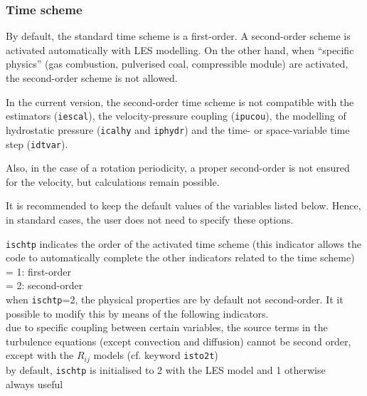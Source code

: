 \subsubsection{Time scheme}

By default, the standard time scheme is a first-order.
A second-order scheme is activated automatically with LES modelling.
On the other hand, when ``specific physics'' (gas combustion, pulverised coal,
compressible module) are activated, the second-order scheme is not allowed.

In the current version, the second-order time scheme is not compatible
with the estimators ({\tt iescal}), the velocity-pressure coupling
({\tt ipucou}), the modelling of hydrostatic pressure ({\tt icalhy} and
{\tt iphydr}) and the time- or space-variable time step ({\tt idtvar}).

Also, in the case of a rotation periodicity, a proper second-order is not
ensured for the velocity, but calculations remain possible.

It is recommended to keep the default values of the variables listed
below. Hence, in standard cases, the user does not need to specify these
options.


{{\tt ischtp} indicates the order of the
activated time scheme (this indicator allows the code to automatically complete
the other indicators related to the time scheme)\\
\hspace*{1.3cm}= 1: first-order \\
\hspace*{1.3cm}= 2: second-order \\
when {\tt ischtp}=2, the physical properties are by default not
second-order. It it possible to modify this by means of the
following indicators.\\
due to specific coupling between certain variables, the source terms in the
turbulence equations (except convection and diffusion) cannot be second order,
except with the $R_{ij}$ models (cf. keyword {\tt isto2t})\\
by default, {\tt ischtp} is initialised to 2 with the LES model and 1
otherwise\\
always useful}

